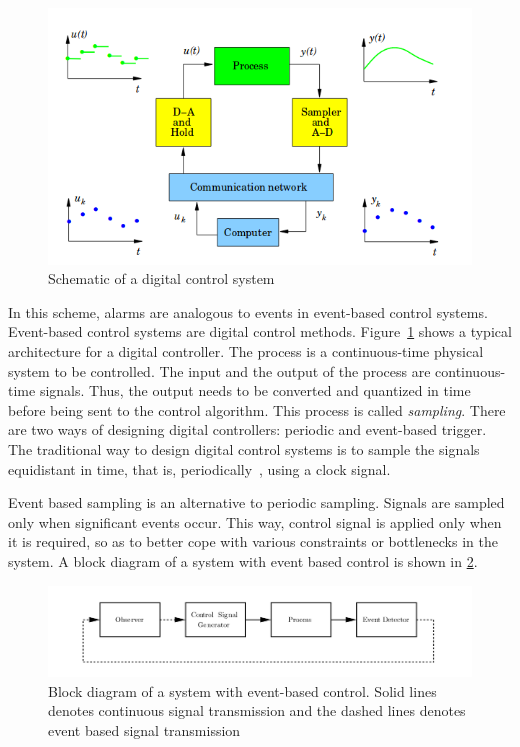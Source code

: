 \begin{figure}[t]
      \centering
      \includegraphics[width = \textwidth]{./pictures/digitalcontrol.png}
      \caption[Digital control system]{Schematic of a digital control system}
      \label{fig:digitalcontrol}
\end{figure}

In this scheme, alarms are analogous to events in event-based control systems. Event-based control systems are digital control methods. Figure~\ref{fig:digitalcontrol} shows a typical architecture for a digital controller. The process is a continuous-time physical system to be controlled. The input and the output of the process are continuous-time signals. Thus, the output needs to be converted and quantized in time before being sent to the control algorithm. This process is called \textit{sampling}. There are two ways of designing digital controllers: periodic and event-based trigger. The traditional way to design digital control systems is to sample the signals equidistant in time, that is, periodically~\cite{aastrom1997computer}, using a clock signal.  

Event based sampling is an alternative to periodic sampling. Signals are sampled only when significant events occur. This way, control signal is applied only when it is required, so as to better cope with various constraints or bottlenecks in the system. A block diagram of a system with event based control is shown in \ref{fig:eventbased}. 

\begin{figure}[t]
	\centering
    \includegraphics[width=\textwidth]{./pictures/eventbased.png}
    \caption[event-based control]{Block diagram of a system with event-based control. Solid lines denotes continuous signal transmission and the dashed lines denotes event based signal transmission}
    \label{fig:eventbased}
\end{figure}
  
